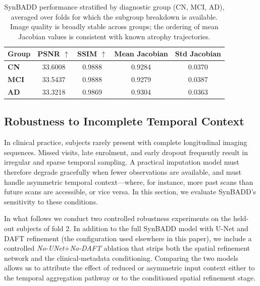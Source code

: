 \begin{table}[ht]
\centering
\caption{SynBADD performance stratified by diagnostic group (CN, MCI, AD), averaged over folds for which the subgroup breakdown is available. Image quality is broadly stable across groups; the ordering of mean Jacobian values is consistent with known atrophy trajectories.}
\begin{tabular}{>{\bfseries}lcccc}
\toprule
Group & PSNR $\uparrow$ & SSIM $\uparrow$ & Mean Jacobian & Std Jacobian \\
\midrule
CN  & 33.6008 & 0.9888 & 0.9284 & 0.0370 \\
MCI & 33.5437 & 0.9888 & 0.9279 & 0.0387 \\
AD  & 33.3218 & 0.9869 & 0.9304 & 0.0363 \\
\bottomrule
\end{tabular}
\label{tab:subgroup_main}
\end{table}


\subsection{Robustness to Incomplete Temporal Context}
\label{sec:robustness}

In clinical practice, subjects rarely present with complete longitudinal imaging sequences. Missed visits, late enrolment, and early dropout frequently result in irregular and sparse temporal sampling. A practical imputation model must therefore degrade gracefully when fewer observations are available, and must handle asymmetric temporal context---where, for instance, more past scans than future scans are accessible, or vice versa. In this section, we evaluate SynBADD's sensitivity to these conditions.

In what follows we conduct two controlled robustness experiments on the held-out subjects of fold 2. In addition to the full SynBADD model with U-Net and DAFT refinement (the configuration used elsewhere in this paper), we include a controlled \textit{No-UNet$+$No-DAFT} ablation that strips both the spatial refinement network and the clinical-metadata conditioning. Comparing the two models allows us to attribute the effect of reduced or asymmetric input context either to the temporal aggregation pathway or to the conditioned spatial refinement stage.


